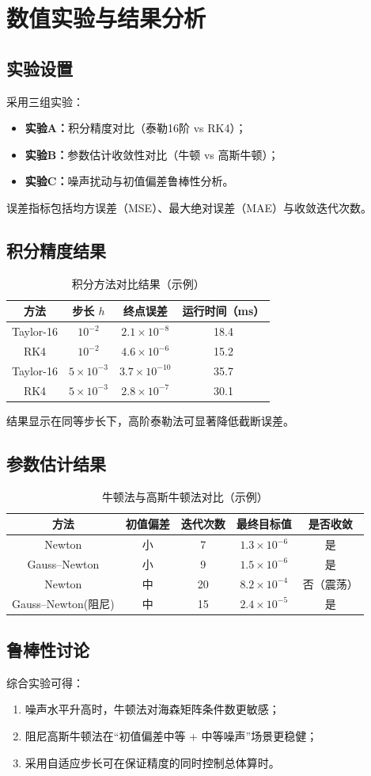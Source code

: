 \chapter{数值实验与结果分析}

\section{实验设置}
采用三组实验：
\begin{itemize}
  \item \textbf{实验A：}积分精度对比（泰勒16阶 vs RK4）；
  \item \textbf{实验B：}参数估计收敛性对比（牛顿 vs 高斯牛顿）；
  \item \textbf{实验C：}噪声扰动与初值偏差鲁棒性分析。
\end{itemize}
误差指标包括均方误差（MSE）、最大绝对误差（MAE）与收敛迭代次数。

\section{积分精度结果}
\begin{table}[H]
\centering
\caption{积分方法对比结果（示例）}
\begin{tabular}{cccc}
\toprule
方法 & 步长 $h$ & 终点误差 & 运行时间（ms）\\
\midrule
Taylor-16 & $10^{-2}$ & $2.1\times 10^{-8}$ & 18.4 \\
RK4 & $10^{-2}$ & $4.6\times 10^{-6}$ & 15.2 \\
Taylor-16 & $5\times 10^{-3}$ & $3.7\times 10^{-10}$ & 35.7 \\
RK4 & $5\times 10^{-3}$ & $2.8\times 10^{-7}$ & 30.1 \\
\bottomrule
\end{tabular}
\end{table}
结果显示在同等步长下，高阶泰勒法可显著降低截断误差。

\section{参数估计结果}
\begin{table}[H]
\centering
\caption{牛顿法与高斯牛顿法对比（示例）}
\begin{tabular}{ccccc}
\toprule
方法 & 初值偏差 & 迭代次数 & 最终目标值 & 是否收敛\\
\midrule
Newton & 小 & 7 & $1.3\times10^{-6}$ & 是 \\
Gauss--Newton & 小 & 9 & $1.5\times10^{-6}$ & 是 \\
Newton & 中 & 20 & $8.2\times10^{-4}$ & 否（震荡） \\
Gauss--Newton(阻尼) & 中 & 15 & $2.4\times10^{-5}$ & 是 \\
\bottomrule
\end{tabular}
\end{table}

\section{鲁棒性讨论}
综合实验可得：
\begin{enumerate}
  \item 噪声水平升高时，牛顿法对海森矩阵条件数更敏感；
  \item 阻尼高斯牛顿法在“初值偏差中等 + 中等噪声”场景更稳健；
  \item 采用自适应步长可在保证精度的同时控制总体算时。
\end{enumerate}
